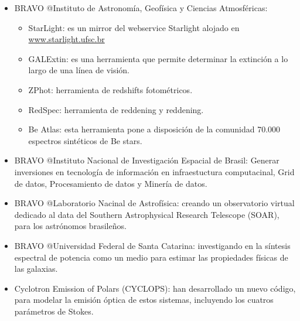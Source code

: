 	\begin{itemize}
		\item BRAVO @Instituto de Astronomía, Geofísica y Ciencias Atmosféricas:
			\begin{itemize}
				\item StarLight: es un mirror del webservice Starlight alojado en \url{www.starlight.ufsc.br}
				\item GALExtin: es una herramienta que permite determinar la extinción a lo largo de una línea de visión.
				\item ZPhot: herramienta de redshifts fotométricos.
				\item RedSpec: herramienta de reddening y reddening.
				\item Be Atlas: esta herramienta pone a disposición de la comunidad 70.000 espectros sintéticos de Be stars.
			\end{itemize}
		\item BRAVO @Instituto Nacional de Investigación Espacial de Brasil: Generar inversiones en tecnología de información en infraestuctura computacinal, Grid de datos, Procesamiento de datos y 
				Minería de datos.
		\item BRAVO @Laboratorio Nacinal de Astrofísica: creando un observatorio virtual dedicado al data del Southern Astrophysical Research Telescope (SOAR), para los astrónomos brasileños.
		\item BRAVO @Universidad Federal de Santa Catarina: investigando en la síntesis espectral de potencia como un medio para estimar las propiedades físicas de las galaxias.
		\item Cyclotron Emission of Polars (CYCLOPS): han desarrollado un nuevo código, para modelar la emisión óptica de estos sistemas, incluyendo los cuatros parámetros de Stokes.
	\end{itemize}
